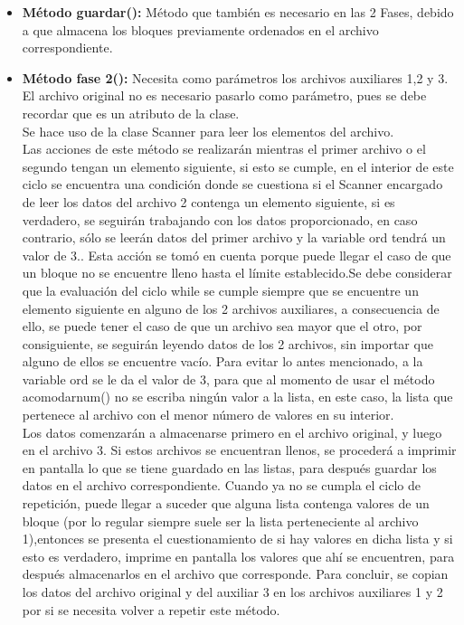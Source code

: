 \documentclass[12pt,letterpaper]{article}
\begin{document}
\begin{large}
\begin{itemize}[noitemsep,topsep=0pt]
\item\textbf{Método guardar():} Método que también es necesario en las 2 Fases, debido a que almacena los bloques previamente ordenados en el archivo correspondiente.
\item\textbf{Método fase 2():} Necesita como parámetros los archivos auxiliares 1,2 y 3. El archivo original no es necesario pasarlo como parámetro, pues se debe recordar que es un atributo de la clase. \\
Se hace uso de la clase Scanner para leer los elementos del archivo. \\
Las acciones de este método se realizarán mientras el primer archivo o el segundo tengan un elemento siguiente, si esto se cumple, en el interior de este ciclo se encuentra una condición donde se cuestiona si el Scanner encargado de leer los datos del archivo 2 contenga un elemento siguiente, si es verdadero, se seguirán trabajando con los datos proporcionado, en caso contrario, sólo se leerán datos del primer archivo y la variable ord tendrá un valor de 3.. Esta acción se tomó en cuenta porque puede llegar el caso de que un bloque no se encuentre lleno hasta el límite establecido.Se debe considerar que la evaluación del ciclo while se cumple siempre que se encuentre un elemento siguiente en alguno de los 2 archivos auxiliares, a consecuencia de ello, se puede tener el caso de que un archivo sea mayor que el otro, por consiguiente, se seguirán leyendo datos de los 2 archivos, sin importar que alguno de ellos se encuentre vacío. Para evitar lo antes mencionado, a la variable ord se le da el valor de 3, para que al momento de usar el método acomodarnum() no se escriba ningún valor a la lista, en este caso, la lista que pertenece al archivo con el menor número de valores en su interior.\\
Los datos comenzarán a almacenarse primero en el archivo original, y luego en el archivo 3. Si estos archivos se encuentran llenos, se procederá a imprimir en pantalla lo que se tiene guardado en las listas, para después guardar los datos en el archivo correspondiente. Cuando ya no se cumpla el ciclo de repetición, puede llegar a suceder que alguna lista contenga valores de un bloque (por lo regular siempre suele ser la lista perteneciente al archivo 1),entonces se presenta el cuestionamiento de si hay valores en dicha lista y si esto es verdadero, imprime en pantalla los valores que ahí se encuentren, para después almacenarlos en el archivo que corresponde. 
Para concluir, se copian los datos del archivo original y del auxiliar 3 en los archivos auxiliares 1 y 2 por si se necesita volver a repetir este método.\\

\end{itemize}
\end{large}
\end{document}
